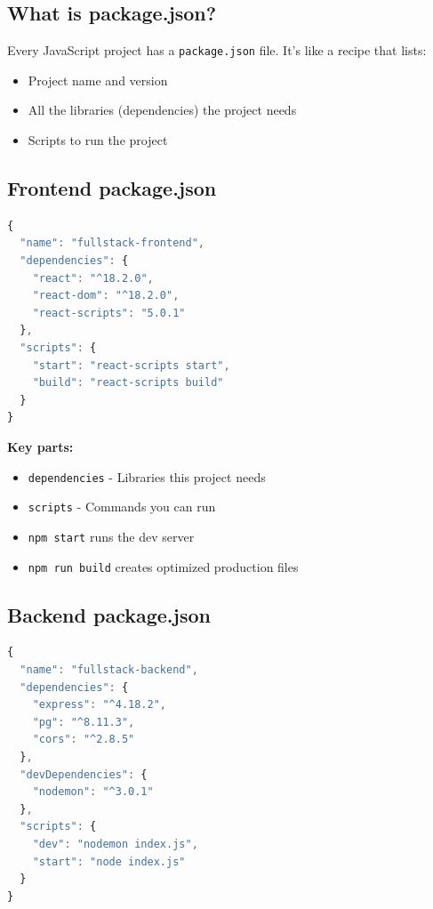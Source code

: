 \documentclass[12pt,a4paper]{article}
\begin{document}
\subsection{What is package.json?}

Every JavaScript project has a \texttt{package.json} file. It's like a recipe that lists:
\begin{itemize}
    \item Project name and version
    \item All the libraries (dependencies) the project needs
    \item Scripts to run the project
\end{itemize}

\subsection{Frontend package.json}

\begin{lstlisting}[language=JavaScript, caption=frontend/package.json]
{
  "name": "fullstack-frontend",
  "dependencies": {
    "react": "^18.2.0",
    "react-dom": "^18.2.0",
    "react-scripts": "5.0.1"
  },
  "scripts": {
    "start": "react-scripts start",
    "build": "react-scripts build"
  }
}
\end{lstlisting}

\textbf{Key parts:}
\begin{itemize}
    \item \texttt{dependencies} - Libraries this project needs
    \item \texttt{scripts} - Commands you can run
    \item \texttt{npm start} runs the dev server
    \item \texttt{npm run build} creates optimized production files
\end{itemize}

\subsection{Backend package.json}

\begin{lstlisting}[language=JavaScript, caption=backend/package.json]
{
  "name": "fullstack-backend",
  "dependencies": {
    "express": "^4.18.2",
    "pg": "^8.11.3",
    "cors": "^2.8.5"
  },
  "devDependencies": {
    "nodemon": "^3.0.1"
  },
  "scripts": {
    "dev": "nodemon index.js",
    "start": "node index.js"
  }
}
\end{lstlisting}
\end{document}
